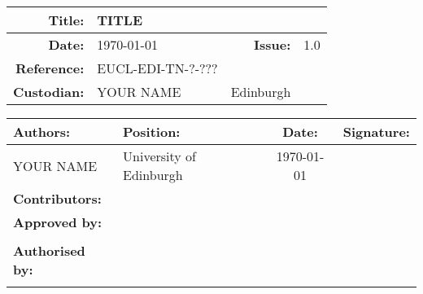 \documentclass[11pt]{EuclidVIS}
\numberwithin{table}{section}
\numberwithin{figure}{section}
\begin{document}
\color{black}
\hypersetup{citecolor=blue}


\section*{}
\vspace{+0.2cm}
\noindent
\begin{tabularx}{1.0\textwidth}{ | r | X | r | l |}
\hline
\textbf{Title:} & TITLE & & \\
\hline
\textbf{Date:} & \today & \textbf{Issue:} & 1.0 \\
\hline
\textbf{Reference:} & EUCL-EDI-TN-?-??? & & \\
\hline
\textbf{Custodian:} & YOUR NAME & Edinburgh &\\
\hline
\end{tabularx}


\vspace{+4cm}
\noindent
\begin{tabularx}{1.0\textwidth}{ | l | X | c | l |}
\hline
\rowcolor{gray!30}
\textbf{Authors:} & \textbf{Position:} & \textbf{Date:} & \textbf{Signature:}\\
\hline
YOUR NAME & University of Edinburgh & \today & \\
\hline
\rowcolor{gray!30}
\textbf{Contributors:} & & & \\
\hline
\hline
\rowcolor{gray!30}
\textbf{Approved by:} & & &\\
\hline
&&&\\
\hline
\rowcolor{gray!30}
\textbf{Authorised by:} & & &\\
\hline
&&&\\
\hline
\end{tabularx}
\end{document}
